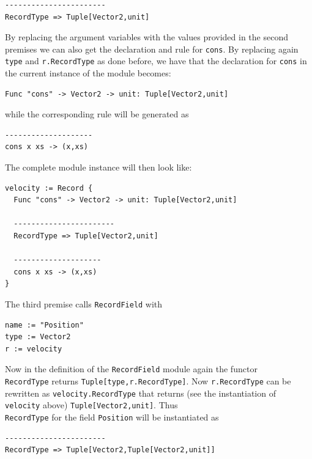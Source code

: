 \begin{lstlisting}
-----------------------
RecordType => Tuple[Vector2,unit]
\end{lstlisting}

By replacing the argument variables with the values provided in the second premises we can also get the declaration and rule for \texttt{cons}. By replacing again \texttt{type} and \texttt{r.RecordType} as done before, we have that the declaration for \texttt{cons} in the current instance of the module becomes:

\begin{lstlisting}
Func "cons" -> Vector2 -> unit: Tuple[Vector2,unit]
\end{lstlisting}

\noindent
while the corresponding rule will be generated as

\begin{lstlisting}
--------------------
cons x xs -> (x,xs)
\end{lstlisting}

\noindent
The complete module instance will then look like:

\begin{lstlisting}
velocity := Record {
  Func "cons" -> Vector2 -> unit: Tuple[Vector2,unit]
  
  -----------------------
  RecordType => Tuple[Vector2,unit]
  
  --------------------
  cons x xs -> (x,xs)
}
\end{lstlisting}

The third premise calls \texttt{RecordField} with 

\begin{lstlisting}
name := "Position"
type := Vector2
r := velocity
\end{lstlisting}

\noindent
Now in the definition of the \texttt{RecordField} module again the functor\\ \texttt{RecordType} returns \texttt{Tuple[type,r.RecordType]}. Now \texttt{r.RecordType} can be rewritten as \texttt{velocity.RecordType} that returns (see the instantiation of \texttt{velocity} above) \texttt{Tuple[Vector2,unit]}. Thus\\ \texttt{RecordType} for the field \texttt{Position} will be instantiated as

\begin{lstlisting}
-----------------------
RecordType => Tuple[Vector2,Tuple[Vector2,unit]]
\end{lstlisting}

